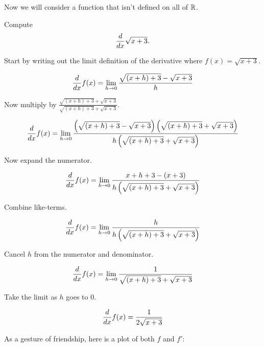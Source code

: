 \documentclass[handout]{ximera}
\begin{document}
Now we will consider a function that isn't defined on all of $\mathbb R$.

\begin{example}
Compute 
\[
\frac{d}{dx} \sqrt{x+3}.
\]
\begin{explantion}
Start by writing out the limit definition of the derivative where
$f(x) = \sqrt{x+3}$.
\begin{freeResponse}[given]
\[
\frac{d}{dx} f(x) = \lim_{h\to 0}\frac{\sqrt{(x+h)+3} - \sqrt{x+3}}{h}
\]
\end{freeResponse}
Now multiply by $\frac{\sqrt{(x+h)+3} + \sqrt{x+3}}{\sqrt{(x+h)+3} + \sqrt{x+3}}$.
\begin{freeResponse}[given]
\[
\frac{d}{dx} f(x) = \lim_{h\to 0}\frac{\left(\sqrt{(x+h)+3} - \sqrt{x+3}\right)\left(\sqrt{(x+h)+3} + \sqrt{x+3}\right)}{h\left(\sqrt{(x+h)+3} + \sqrt{x+3}\right)}
\]
\end{freeResponse}
Now expand the numerator.
\begin{freeResponse}[given]
\[
\frac{d}{dx} f(x) = \lim_{h\to 0}\frac{x+h+3 - (x+3)}{h\left(\sqrt{(x+h)+3} + \sqrt{x+3}\right)}
\]
\end{freeResponse}
Combine like-terms.
\begin{freeResponse}[given]
\[
\frac{d}{dx} f(x) = \lim_{h\to 0}\frac{h}{h\left(\sqrt{(x+h)+3} + \sqrt{x+3}\right)}
\]
\end{freeResponse}
Cancel $h$ from the numerator and denominator.
\begin{freeResponse}[given]
\[
\frac{d}{dx} f(x) = \lim_{h\to 0}\frac{1}{\sqrt{(x+h)+3} + \sqrt{x+3}}
\]
\end{freeResponse}
Take the limit as $h$ goes to $0$. 
\begin{freeResponse}[given]
\[
\frac{d}{dx} f(x) = \frac{1}{2\sqrt{x+3}}
\]
\end{freeResponse}
As a gesture of friendship, here is a plot of both $f$ and $f'$:
\begin{image}
\end{image}
\end{explantion}
\end{example}
\end{document}
